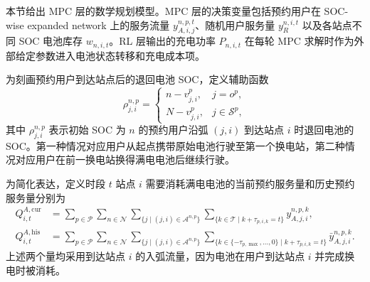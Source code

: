 \documentclass[12pt,hyperref,a4paper,UTF8]{ctexart}
\begin{document}
本节给出 MPC 层的数学规划模型。MPC 层的决策变量包括预约用户在 SOC-wise expanded network 上的服务流量 $y_{A,i,j}^{n,p,t}$、随机用户服务量 $y_R^{n,i,t}$ 以及各站点不同 SOC 电池库存 $w_{n,i,t}$。RL 层输出的充电功率 $P_{n,i,t}$ 在每轮 MPC 求解时作为外部给定参数进入电池状态转移和充电成本项。

为刻画预约用户到达站点后的退回电池 SOC，定义辅助函数
\begin{equation}
\rho_{j,i}^{n,p}=
\begin{cases}
 n-v_{j,i}^{p}, & j=o^p,\\
 N-v_{j,i}^{p}, & j\in\mathcal{S}^{p},
\end{cases}
\label{eq:return_soc}
\end{equation}
其中 $\rho_{j,i}^{n,p}$ 表示初始 SOC 为 $n$ 的预约用户沿弧 $(j,i)$ 到达站点 $i$ 时退回电池的 SOC。第一种情况对应用户从起点携带原始电池行驶至第一个换电站，第二种情况对应用户在前一换电站换得满电电池后继续行驶。

为简化表达，定义时段 $t$ 站点 $i$ 需要消耗满电电池的当前预约服务量和历史预约服务量分别为
\begin{align}
Q_{i,t}^{A,\mathrm{cur}}
&=
\sum_{p\in\mathcal{P}}
\sum_{n\in\mathcal{N}}
\sum_{\{j\mid (j,i)\in\mathcal{A}^{n,p}\}}
\sum_{\{k\in\mathcal{T}\mid k+\tau_{p,i,k}=t\}}
y_{A,j,i}^{n,p,k},
\label{eq:current_reservation_swap}\\
Q_{i,t}^{A,\mathrm{his}}
&=
\sum_{p\in\mathcal{P}}
\sum_{n\in\mathcal{N}}
\sum_{\{j\mid (j,i)\in\mathcal{A}^{n,p}\}}
\sum_{\{k\in\{-\tau_{p,\max},\ldots,0\}\mid k+\tau_{p,i,k}=t\}}
\bar{y}_{A,j,i}^{n,p,k}.
\label{eq:historical_reservation_swap}
\end{align}
上述两个量均采用到达站点 $i$ 的入弧流量，因为电池在用户到达站点 $i$ 并完成换电时被消耗。
\end{document}
